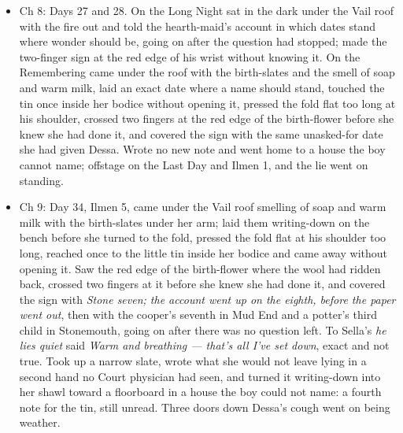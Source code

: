\documentclass{design/chronicle}
\begin{document}
{\begin{itemize}[leftmargin=1.4em,itemsep=1pt,topsep=3pt,parsep=0pt]
\end{itemize}

\begin{itemize}[leftmargin=1.4em,itemsep=1pt,topsep=3pt,parsep=0pt]

\item Ch 8: Days 27 and 28. On the Long Night sat in the dark under the Vail roof with the fire out and told the hearth-maid’s account in which dates stand where wonder should be, going on after the question had stopped; made the two-finger sign at the red edge of his wrist without knowing it. On the Remembering came under the roof with the birth-slates and the smell of soap and warm milk, laid an exact date where a name should stand, touched the tin once inside her bodice without opening it, pressed the fold flat too long at his shoulder, crossed two fingers at the red edge of the birth-flower before she knew she had done it, and covered the sign with the same unasked-for date she had given Dessa. Wrote no new note and went home to a house the boy cannot name; offstage on the Last Day and Ilmen 1, and the lie went on standing.

\end{itemize}

\begin{itemize}[leftmargin=1.4em,itemsep=1pt,topsep=3pt,parsep=0pt]

\item Ch 9: Day 34, Ilmen 5, came under the Vail roof smelling of soap and warm milk with the birth-slates under her arm; laid them writing-down on the bench before she turned to the fold, pressed the fold flat at his shoulder too long, reached once to the little tin inside her bodice and came away without opening it. Saw the red edge of the birth-flower where the wool had ridden back, crossed two fingers at it before she knew she had done it, and covered the sign with \emph{Stone seven; the account went up on the eighth, before the paper went out}, then with the cooper’s seventh in Mud End and a potter’s third child in Stonemouth, going on after there was no question left. To Sella’s \emph{he lies quiet} said \emph{Warm and breathing --- that’s all I’ve set down}, exact and not true. Took up a narrow slate, wrote what she would not leave lying in a second hand no Court physician had seen, and turned it writing-down into her shawl toward a floorboard in a house the boy could not name: a fourth note for the tin, still unread. Three doors down Dessa’s cough went on being weather.

\end{itemize}

}
\end{document}
